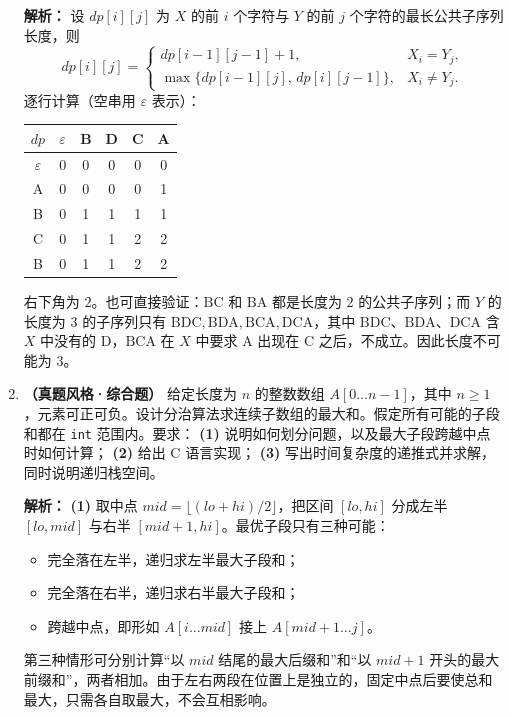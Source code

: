 \begin{enumerate}[resume]
\ifshowsolutions\par\noindent\textbf{解析：} 设 $dp[i][j]$ 为 $X$ 的前 $i$ 个字符与 $Y$ 的前 $j$ 个字符的最长公共子序列长度，则
\[
dp[i][j]=
\begin{cases}
dp[i-1][j-1]+1, & X_i=Y_j,\\
\max\{dp[i-1][j],\,dp[i][j-1]\}, & X_i\ne Y_j.
\end{cases}
\]
逐行计算（空串用 $\varepsilon$ 表示）：
\begin{center}
\begin{tabular}{c|ccccc}
\hline
$dp$ & $\varepsilon$ & B & D & C & A\\
\hline
$\varepsilon$ & 0 & 0 & 0 & 0 & 0\\
A & 0 & 0 & 0 & 0 & 1\\
B & 0 & 1 & 1 & 1 & 1\\
C & 0 & 1 & 1 & 2 & 2\\
B & 0 & 1 & 1 & 2 & 2\\
\hline
\end{tabular}
\end{center}
右下角为 $2$。也可直接验证：$\text{BC}$ 和 $\text{BA}$ 都是长度为 $2$ 的公共子序列；而 $Y$ 的长度为 $3$ 的子序列只有 $\text{BDC},\text{BDA},\text{BCA},\text{DCA}$，其中 $\text{BDC}$、$\text{BDA}$、$\text{DCA}$ 含 $X$ 中没有的 D，$\text{BCA}$ 在 $X$ 中要求 A 出现在 C 之后，不成立。因此长度不可能为 $3$。\else \answerarea[8] \fi

\item \textbf{（真题风格·综合题）} 给定长度为 $n$ 的整数数组 $A[0\ldots n-1]$，其中 $n\ge 1$，元素可正可负。设计分治算法求连续子数组的最大和。假定所有可能的子段和都在 \texttt{int} 范围内。要求：
\textbf{(1)} 说明如何划分问题，以及最大子段跨越中点时如何计算；
\textbf{(2)} 给出 C 语言实现；
\textbf{(3)} 写出时间复杂度的递推式并求解，同时说明递归栈空间。

\ifshowsolutions\par\noindent\textbf{解析：} \textbf{(1)} 取中点 $mid=\lfloor (lo+hi)/2\rfloor$，把区间 $[lo,hi]$ 分成左半 $[lo,mid]$ 与右半 $[mid+1,hi]$。最优子段只有三种可能：
\begin{itemize}
\item 完全落在左半，递归求左半最大子段和；
\item 完全落在右半，递归求右半最大子段和；
\item 跨越中点，即形如 $A[i\ldots mid]$ 接上 $A[mid+1\ldots j]$。
\end{itemize}
第三种情形可分别计算“以 $mid$ 结尾的最大后缀和”和“以 $mid+1$ 开头的最大前缀和”，两者相加。由于左右两段在位置上是独立的，固定中点后要使总和最大，只需各自取最大，不会互相影响。


\end{enumerate}
